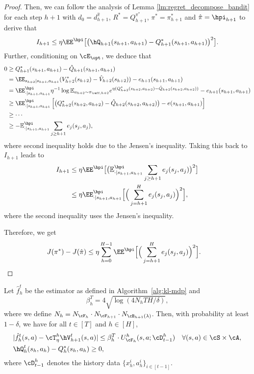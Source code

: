 \documentclass[11pt]{article}
\newcommand{\E}{\mathbb E}
\begin{document}
\begin{proof}
Then, we can follow the analysis of Lemma \ref{lm:regret_decompose_bandit} for each step $h+1$ with $d_0=d_{h + 1}^{\hat\pi}$, $R^*=Q_{h + 1}^{\pi^*}$, $\pi^*=\pi^*_{h+1}$ and $\hat\pi=\hpi_{h+1}$ to derive that
\begin{align*}
I_{h+1}
    \le \eta\EE^{\hpi}\big[\big(\hQ_{h + 1}(s_{h + 1},a_{h+1}) - Q_{h + 1}^*(s_{h + 1},a_{h+1})\big)^2\big].
\end{align*}
Further, conditioning on $\cE_{\opt}$, we deduce that
\begin{align*}
0 &\geq Q^*_{h+1}(s_{h+1},a_{h+1})-\hat{Q}_{h+1}(s_{h+1},a_{h+1})\\
&=
\EE_{s_{h+2}|s_{h+1},a_{h+1}} (V_{h+2}^*(s_{h+2})-\hat{V}_{h+2}(s_{h+2})) - e_{h+1}(s_{h+1},a_{h+1}) \\
&= 
\EE^{\hpi}_{\cdot|s_{h+1},a_{h+1}}
  \eta^{-1}\log \E_{a_{h+2}\sim\pi_{\reff,h+2}} e^{\eta(Q_{h+2}^*(s_{h+2},a_{h+2})-\hat{Q}_{h+2}(s_{h+2},a_{h+2}))}
- e_{h+1}(s_{h+1},a_{h+1})\\
&\geq  
\EE^{\hpi}_{\cdot|s_{h+1},a_{h+1}} \left[
  \big(Q_{h+2}^*(s_{h+2},a_{h+2})-\hat{Q}_{h+2}(s_{h+2},a_{h+2})\big)
-e(s_{h+1},a_{h+1}) \right] \\
&\geq  \cdots \\
&\geq  - \E^{\hpi}_{\cdot|s_{h+1},a_{h+1}} \sum_{j\geq h+1}
e_j(s_j,a_j),
\end{align*}
where second inequality holds due to the Jensen's inequality. Taking this back to $I_{h+1}$ leads to 
\begin{align*}
I_{h+1}
    &\le \eta\EE^{\hpi}\big[\big(\E^{\hpi}_{\cdot|s_{h+1},a_{h+1}} \sum_{j\geq h+1}
e_j(s_j,a_j)\big)^2\big]\\
    &\le \eta\EE^{\hpi}_{\cdot|s_{h+1},a_{h+1}} \Big[\Big(\sum_{j=h+1}^H e_j(s_j,a_j) \Big)^2\Big],
\end{align*}
where the second inequality uses the Jensen's inequality.

Therefore, we get
\begin{align*}
    J(\pi^*) - J(\hat \pi) &\le \eta \sum_{h = 0}^{H - 1}\EE^{\hpi} \Big[\Big(\sum_{j=h+1}^H e_j(s_j,a_j) \Big)^2\Big].
\end{align*}
\end{proof}


\begin{lemma}\label{lm:Confidence Sets_mdp}
    Let $\hat f^t_h$ be the estimator as defined in Algorithm~\ref{alg:kl-mdp} and
    $$
    \beta_h^T = 4\sqrt{\log(4N_h T H / \delta)},
    $$ 
    where we define $N_h=N_{\cF_h}\cdot N_{\cF_{h+1}}\cdot N_{\cB_{h+1}(\lambda)}$.
    Then, with probability at least $1 - \delta$, we have for all $t\in[T]$ and $h\in[H]$,
    \begin{align*} 
        &| \hat f^t_h(s, a) - \cT_\eta^h \hV^t_{h+1}(s, a) | \le \beta^T_h\cdot U^h_{\cF_h}(s, a; \cD^h_{t-1}) \quad \forall (s, a) \in \cS \times \cA,\\
        &\hQ^t_h(s_h,a_h)-Q^*_h(s_h,a_h) \ge 0,
    \end{align*}
    where $\cD^h_{t-1}$ denotes the history data $\{x_h^i,a_h^i\}_{i\in[t-1]}$.
\end{lemma}
\end{document}
